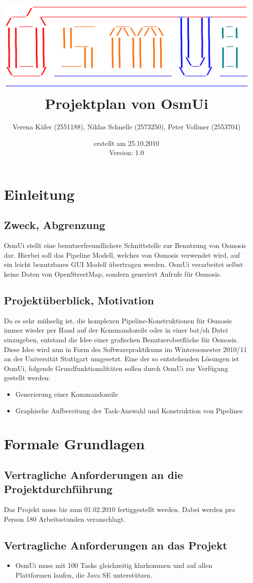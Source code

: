 \documentclass[a4paper,10pt]{scrartcl}
\author{Verena Käfer (2551188), Niklas Schnelle (2573250), Peter Vollmer (2553704)}
\date{erstellt am 25.10.2010\\
Version: 1.0}
\title{\includegraphics[width=15cm]{Logo_Osmui.png} \\ 
Projektplan von OsmUi}
\begin{document}
\maketitle
\newpage
\tableofcontents
\newpage


\section{Einleitung}
\subsection{Zweck, Abgrenzung}
OsmUi stellt eine benutzerfreundlichere Schnittstelle zur Benutzung von Osmosis dar. Hierbei soll das Pipeline Modell, welches von Osmosis verwendet wird, auf ein leicht benutzbares GUI Modell übertragen werden.
OsmUi verarbeitet selbst keine Daten von OpenStreetMap, sondern generiert Aufrufe für Osmosis. 
\subsection{Projektüberblick, Motivation}
Da es sehr mühselig ist, die komplexen Pipeline-Konstruktionen für Osmosis immer wieder per Hand auf der Kommandozeile oder in einer bat/sh Datei einzugeben, 
entstand die Idee einer grafischen Benutzeroberfläche für Osmosis.
Diese Idee wird nun in Form des Softwarepraktikums im Wintersemester 2010/11 an der Universität Stuttgart umgesetzt.
Eine der so entstehenden Lösungen ist OsmUi, folgende Grundfunktionalitäten sollen durch OsmUi zur Verfügung gestellt werden:
\begin{itemize}
\item Generierung einer Kommandozeile
\item Graphische Aufbereitung der Task-Auswahl und Konstruktion von Pipelines
\end{itemize}

\section{Formale Grundlagen}
\subsection{Vertragliche Anforderungen an die Projektdurchführung}
Das Projekt muss bis zum 01.02.2010 fertiggestellt werden. Dabei werden pro Person 180 Arbeitsstunden veranschlagt.
\subsection{Vertragliche Anforderungen an das Projekt}
\begin{itemize}
\item OsmUi muss mit 100 Tasks gleichzeitig klarkommen und auf allen Plattformen laufen, die Java SE unterstützen.  
\end{itemize}
\end{document}
